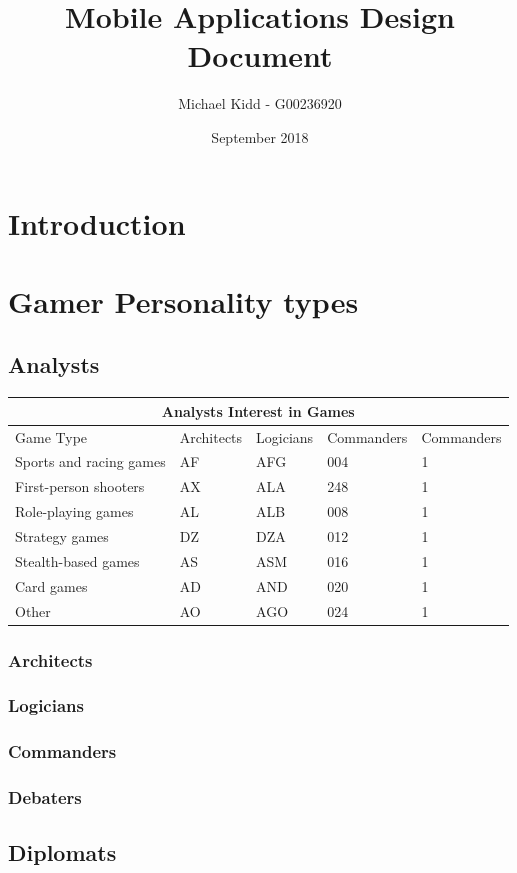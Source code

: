 \documentclass{article}
\title{Mobile Applications Design Document}
\author{Michael Kidd - G00236920}
\date{September 2018}
\begin{document}
 
\maketitle
\clearpage
\tableofcontents
\clearpage 
\section{Introduction}
\clearpage
\section{Gamer Personality types}
\subsection{Analysts}
\begin{tabular}{ |p{4cm}||p{3cm}|p{3cm}|p{3cm}|p{3cm}|  }
 \hline
 \multicolumn{5}{|c|}{Analysts Interest in Games} \\
 \hline
 Game Type& Architects &Logicians&Commanders&Commanders\\
 \hline
 Sports and racing games   & AF    &AFG&   004 &1\\
 First-person shooters&   AX  & ALA   &248&1\\
 Role-playing games &AL & ALB&  008&1\\
 Strategy games    &DZ & DZA&  012&1\\
 Stealth-based games&   AS  & ASM&016&1\\
 Card games& AD  & AND   &020&1\\
 Other& AO  & AGO&024&1\\
 \hline
\end{tabular}
\subsubsection{Architects}
\subsubsection{Logicians}
\subsubsection{Commanders}
\subsubsection{Debaters}
\subsection{Diplomats}
\end{document}
